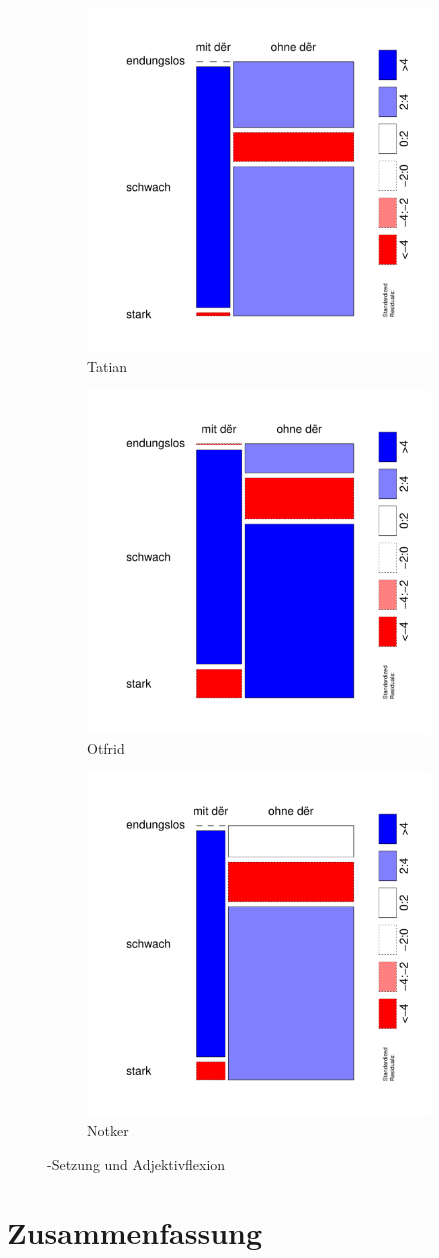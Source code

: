 \begin{figure}
\begin{subfigure}[b]{.5\linewidth}
  \includegraphics[width=6 cm]{generated/images/adjektive-T}
\caption {Tatian}
\end{subfigure}%
\begin{subfigure}[b]{.5\linewidth}
  \includegraphics[width=6 cm]{generated/images/adjektive-O}
\caption {Otfrid}
\end{subfigure}
\begin{subfigure}[b]{.5\linewidth}
  \includegraphics[width=6 cm]{generated/images/adjektive-N}
\caption {Notker}
\end{subfigure}
\caption{-Setzung und Adjektivflexion}
\label{fig:ther-adj}
\end{figure}

\section{Zusammenfassung}

